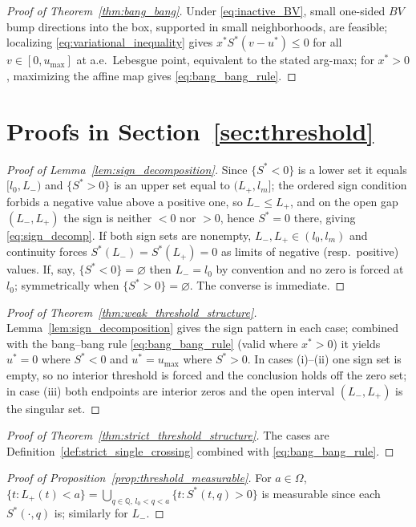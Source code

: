 \documentclass[pdflatex,sn-mathphys-num]{sn-jnl}
\newcommand{\Om}{\Omega}
\theoremstyle{plain}
\theoremstyle{definition}
\theoremstyle{remark}
\begin{document}
\begin{proof}[Proof of Theorem~\ref{thm:bang_bang}]
Under \eqref{eq:inactive_BV}, small one-sided $BV$ bump directions into the box,
supported in small neighborhoods, are feasible; localizing
\eqref{eq:variational_inequality} gives
$x^*S^*(v-u^*)\le0$ for all $v\in[0,u_{\max}]$ at a.e.\ Lebesgue point, equivalent
to the stated arg-max; for $x^*>0$, maximizing the affine map gives
\eqref{eq:bang_bang_rule}.
\end{proof}

\section{Proofs in Section~\ref{sec:threshold}}

\begin{proof}[Proof of Lemma~\ref{lem:sign_decomposition}]
Since $\{S^*<0\}$ is a lower set it equals $[l_0,L_-)$ and $\{S^*>0\}$ is an upper
set equal to $(L_+,l_m]$; the ordered sign condition forbids a negative value above
a positive one, so $L_-\le L_+$, and on the open gap $(L_-,L_+)$ the sign is
neither $<0$ nor $>0$, hence $S^*=0$ there, giving \eqref{eq:sign_decomp}. If both
sign sets are nonempty, $L_-,L_+\in(l_0,l_m)$ and continuity forces
$S^*(L_-)=S^*(L_+)=0$ as limits of negative (resp.\ positive) values. If, say,
$\{S^*<0\}=\varnothing$ then $L_-=l_0$ by convention and no zero is forced at
$l_0$; symmetrically when $\{S^*>0\}=\varnothing$. The converse is immediate.
\end{proof}

\begin{proof}[Proof of Theorem~\ref{thm:weak_threshold_structure}]
Lemma~\ref{lem:sign_decomposition} gives the sign pattern in each case; combined
with the bang--bang rule \eqref{eq:bang_bang_rule} (valid where $x^*>0$) it yields
$u^*=0$ where $S^*<0$ and $u^*=u_{\max}$ where $S^*>0$. In cases (i)--(ii) one sign
set is empty, so no interior threshold is forced and the conclusion holds off the
zero set; in case (iii) both endpoints are interior zeros and the open interval
$(L_-,L_+)$ is the singular set.
\end{proof}

\begin{proof}[Proof of Theorem~\ref{thm:strict_threshold_structure}]
The cases are Definition~\ref{def:strict_single_crossing} combined with
\eqref{eq:bang_bang_rule}.
\end{proof}

\begin{proof}[Proof of Proposition~\ref{prop:threshold_measurable}]
For $a\in\Om$, $\{t:L_+(t)<a\}=\bigcup_{q\in\mathbb Q,\,l_0<q<a}\{t:S^*(t,q)>0\}$
is measurable since each $S^*(\cdot,q)$ is; similarly for $L_-$.
\end{proof}
\end{document}
